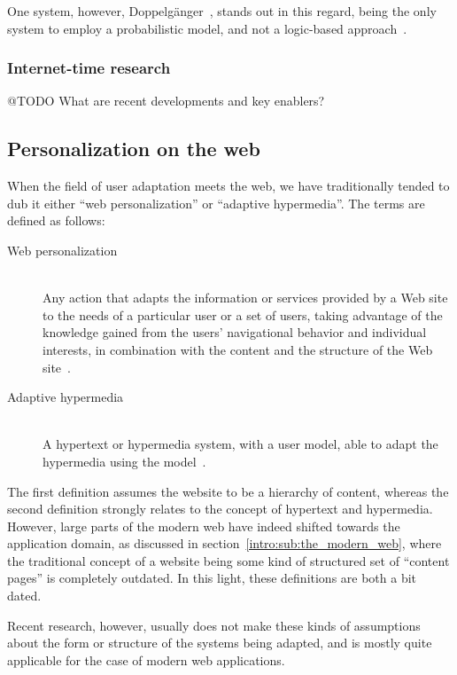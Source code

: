One system, however, Doppelgänger~\cite{Orwant1995}, stands out in this regard, being the only system to employ a probabilistic model, and not a logic-based approach~\cite{Kobsa2001,Pohl1997,Pohl1999}.

\subsubsection{Internet-time research}

@TODO What are recent developments and key enablers?

\subsection{Personalization on the web}
\label{survey:sub:web_personalization}

When the field of user adaptation meets the web, we have traditionally tended to dub it either ``web personalization'' or ``adaptive hypermedia''. The terms are defined as follows:

\begin{description}
    \item[Web personalization] \hfill \\
      Any action that adapts the information or services provided by a Web site to the needs of a particular user or a set of users, taking advantage of the knowledge gained from the users' navigational behavior and individual interests, in combination with the content and the structure of the Web site~\cite{Eirinaki2003}.
    \item[Adaptive hypermedia] \hfill \\
      A hypertext or hypermedia system, with a user model, able to adapt the hypermedia using the model~\cite{Brusilovsky1996}.
\end{description}

The first definition assumes the website to be a hierarchy of content, whereas the second definition strongly relates to the concept of hypertext and hypermedia. However, large parts of the modern web have indeed shifted towards the application domain, as discussed in section~\ref{intro:sub:the_modern_web}, where the traditional concept of a website being some kind of structured set of ``content pages'' is completely outdated. In this light, these definitions are both a bit dated.

Recent research, however, usually does not make these kinds of assumptions about the form or structure of the systems being adapted, and is mostly quite applicable for the case of modern web applications.

